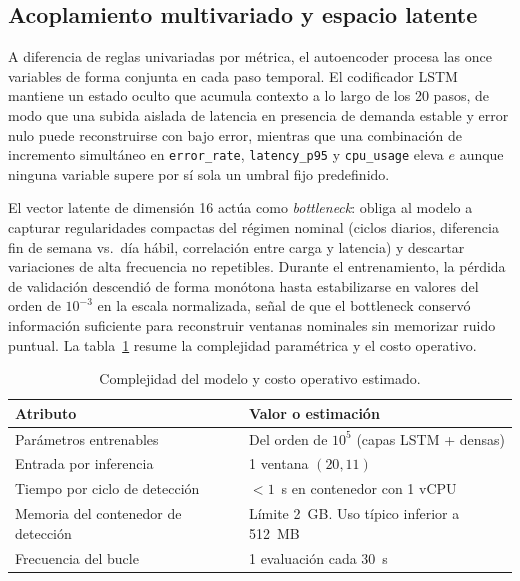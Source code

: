 \subsection{Acoplamiento multivariado y espacio latente}

A diferencia de reglas univariadas por métrica, el autoencoder procesa las once variables de forma conjunta en cada paso temporal. El codificador LSTM mantiene un estado oculto que acumula contexto a lo largo de los 20 pasos, de modo que una subida aislada de latencia en presencia de demanda estable y error nulo puede reconstruirse con bajo error, mientras que una combinación de incremento simultáneo en \texttt{error\_rate}, \texttt{latency\_p95} y \texttt{cpu\_usage} eleva $e$ aunque ninguna variable supere por sí sola un umbral fijo predefinido.

El vector latente de dimensión 16 actúa como \textit{bottleneck}: obliga al modelo a capturar regularidades compactas del régimen nominal (ciclos diarios, diferencia fin de semana vs.\ día hábil, correlación entre carga y latencia) y descartar variaciones de alta frecuencia no repetibles. Durante el entrenamiento, la pérdida de validación descendió de forma monótona hasta estabilizarse en valores del orden de $10^{-3}$ en la escala normalizada, señal de que el bottleneck conservó información suficiente para reconstruir ventanas nominales sin memorizar ruido puntual. La tabla~\ref{tab:complejidad-modelo} resume la complejidad paramétrica y el costo operativo.

\begin{table}[h]
\centering
\small
\caption{Complejidad del modelo y costo operativo estimado.}
\label{tab:complejidad-modelo}
\begin{tabular}{@{}p{}p{}@{}}
\toprule
\textbf{Atributo} & \textbf{Valor o estimación} \\
\midrule
Parámetros entrenables & Del orden de $10^5$ (capas LSTM + densas) \\
Entrada por inferencia & 1 ventana $(20, 11)$ \\
Tiempo por ciclo de detección & $< 1$~s en contenedor con 1 vCPU \\
Memoria del contenedor de detección & Límite 2~GB. Uso típico inferior a 512~MB \\
Frecuencia del bucle & 1 evaluación cada 30~s \\
\bottomrule
\end{tabular}
\end{table}

